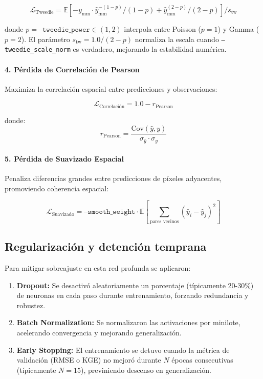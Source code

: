 \begin{equation}
	\mathcal{L}_{\text{Tweedie}} = \mathbb{E}\left[-y_{\text{mm}} \cdot \hat{y}_{\text{mm}}^{-(1-p)} / (1-p) + \hat{y}_{\text{mm}}^{(2-p)} / (2-p)\right] / s_{\text{tw}}
\end{equation}

donde $p = \texttt{--tweedie\_power} \in (1, 2)$ interpola entre Poisson ($p=1$) y Gamma ($p=2$). El parámetro $s_{\text{tw}} = 1.0 / (2 - p)$ normaliza la escala cuando \texttt{--tweedie\_scale\_norm} es verdadero, mejorando la estabilidad numérica.

\paragraph{4. Pérdida de Correlación de Pearson}
Maximiza la correlación espacial entre predicciones y observaciones:

\begin{equation}
	\mathcal{L}_{\text{Correlación}} = 1.0 - r_{\text{Pearson}}
\end{equation}

donde:
\begin{equation}
	r_{\text{Pearson}} = \frac{\text{Cov}(\hat{y}, y)}{\sigma_{\hat{y}} \cdot \sigma_y}
\end{equation}

\paragraph{5. Pérdida de Suavizado Espacial}
Penaliza diferencias grandes entre predicciones de píxeles adyacentes, promoviendo coherencia espacial:

\begin{equation}
	\mathcal{L}_{\text{Suavizado}} = \texttt{--smooth\_weight} \cdot \mathbb{E}\left[\sum_{\text{pares vecinos}} (\hat{y}_i - \hat{y}_j)^2\right]
\end{equation}

\subsection{Regularización y detención temprana}
Para mitigar sobreajuste en esta red profunda se aplicaron:

\begin{enumerate}
    \item \textbf{Dropout:} Se desactivó aleatoriamente un porcentaje (típicamente 20-30\%) de neuronas en cada paso durante entrenamiento, forzando redundancia y robustez.
    \item \textbf{Batch Normalization:} Se normalizaron las activaciones por minilote, acelerando convergencia y mejorando generalización.
    \item \textbf{Early Stopping:} El entrenamiento se detuvo cuando la métrica de validación (RMSE o KGE) no mejoró durante $N$ épocas consecutivas (típicamente $N=15$), previniendo descenso en generalización.
\end{enumerate}

